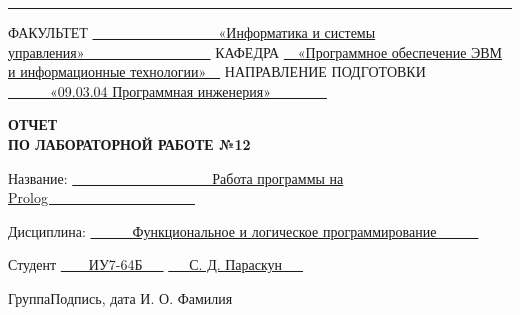 \begin{titlepage}
	\noindent\rule{18cm}{1.5pt}
	
	\vspace{8mm}
	
	\noindent\textnormal{ФАКУЛЬТЕТ}\hspace{5mm} \underline{\textnormal{~~~~~~~~~~~~~~~~~~«Информатика и системы управления»~~~~~~~~~~~~~~~~~~}} \newline\newline
	\textnormal{КАФЕДРА}\hspace{5mm} \underline{\textnormal{~~«Программное обеспечение ЭВМ и информационные технологии»~~}}
	\newline\newline
	\textnormal{НАПРАВЛЕНИЕ ПОДГОТОВКИ}\hspace{5mm} \underline{\textnormal{~~~~~~«09.03.04 Программная инженерия»~~~~~~~~}}
	
	\vspace{2.5cm}
	
	\begin{center}
		\Large\textbf{\textsc{ОТЧЕТ}}\\
		\Large\textbf{\textsc{ПО ЛАБОРАТОРНОЙ РАБОТЕ №12}}\\
	\end{center}
	
	\vspace{1cm}
	
	\noindent\textnormal{Название:} \hspace{15mm} \underline{\textnormal{~~~~~~~~~~~~~~~~~~~~Работа программы на Prolog~~~~~~~~~~~~~~~~~~~~~}}\noindent
	
	\vspace{1.3cm}
	
	\noindent\textnormal{Дисциплина:} \hspace{10mm} \underline{\textnormal{~~~~~~Функциональное и логическое программирование~~~~~~}}\noindent
	
	\vspace{1.5cm}
	
	\noindent\textnormal{Студент} \hspace{17mm}
	\underline{\textnormal{{~~~~ИУ7-64Б~~~}}}
	\hspace{20mm}
	\underline{\textnormal{\hphantom{~~~~~~~~~~~~~~~~~~~~~~~~~~~}}} \hspace{14mm}
	\underline{\textnormal{~~~С. Д. Параскун~~~}}
	
	\vspace{2mm}
	\noindent\textnormal{\hphantom{Студент}} \hspace{23mm}\noindent
	\fontsize{8pt}{8pt}
	\textnormal{Группа}\hspace{40mm}\textnormal{Подпись, дата} \hspace{30mm}\noindent\textnormal{И. О. Фамилия}
	

\end{titlepage}
